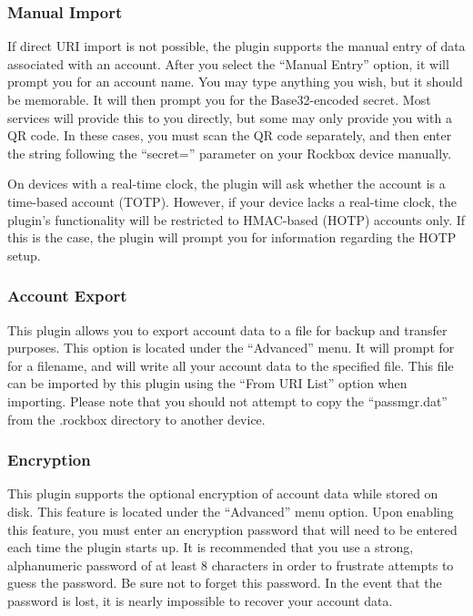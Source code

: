 \subsubsection{Manual Import}
If direct URI import is not possible, the plugin supports the manual
entry of data associated with an account. After you select the
``Manual Entry'' option, it will prompt you for an account name. You
may type anything you wish, but it should be memorable. It will then
prompt you for the Base32-encoded secret. Most services will provide
this to you directly, but some may only provide you with a QR code. In
these cases, you must scan the QR code separately, and then enter the
string following the ``secret='' parameter on your Rockbox device
manually.

On devices with a real-time clock,  the plugin
will ask whether the account is a time-based account
(TOTP).  However, if your device lacks a
real-time clock, the plugin's functionality will be restricted to
HMAC-based (HOTP) accounts only. If this is the case, the plugin will
prompt you for information regarding the HOTP setup.

\subsubsection{Account Export}
This plugin allows you to export account data to a file for backup and
transfer purposes. This option is located under the ``Advanced''
menu. It will prompt for for a filename, and will write all your
account data to the specified file. This file can be imported by this
plugin using the ``From URI List'' option when importing. Please note
that you should not attempt to copy the ``passmgr.dat'' from the
.rockbox directory to another device.

\subsubsection{Encryption}
This plugin supports the optional encryption of account data while
stored on disk. This feature is located under the ``Advanced'' menu
option. Upon enabling this feature, you must enter an encryption
password that will need to be entered each time the plugin starts
up. It is recommended that you use a strong, alphanumeric password of
at least 8 characters in order to frustrate attempts to guess the
password. Be sure not to forget this password. In the event that the
password is lost, it is nearly impossible to recover your account
data.


